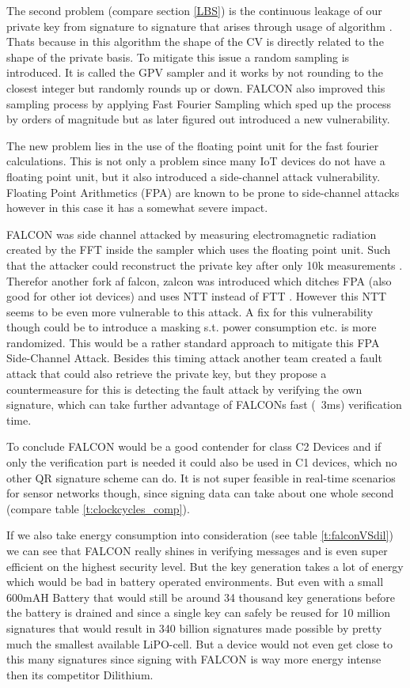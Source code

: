 \documentclass[conference]{IEEEtran}
\begin{document}
The second problem (compare section \ref{LBS}) is the continuous leakage of our private key from signature to signature that arises through usage of algorithm \label{alg:babel}. Thats because in this algorithm the shape of the CV is directly related to the shape of the private basis.
To mitigate this issue a random sampling is introduced. It is called the GPV sampler \cite{falcon_easyier_read} and it works by not rounding to the closest integer but randomly rounds up or down.
FALCON also improved this sampling process by applying Fast Fourier Sampling which sped up the process by orders of magnitude but as later figured out introduced a new vulnerability. 

The new problem lies in the use of the floating point unit for the fast fourier calculations. This is not only a problem since many IoT devices do not have a floating point unit, but it also introduced a side-channel attack vulnerability.
Floating Point Arithmetics (FPA) are known to be prone to side-channel attacks however in this case it has a somewhat severe impact.

FALCON was side channel attacked by measuring electromagnetic radiation created by the FFT inside the sampler which uses the floating point unit. Such that the attacker could reconstruct the private key after only 10k measurements \cite{falcon_side_channel}. Therefor another fork af falcon, zalcon was introduced which ditches FPA (also good for other iot devices) and uses NTT instead of FTT \cite{zalcon}. However this NTT seems to be even more vulnerable to this attack\cite{falcon_side_channel}. A fix for this vulnerability though could be to introduce a masking s.t. power consumption etc. is more randomized. This would be a rather standard approach to mitigate this FPA Side-Channel Attack.
Besides this timing attack another team \cite{bearz} created a fault attack that could also retrieve the private key, but they propose a countermeasure for this is detecting the fault attack by verifying the own signature, which can take further advantage of FALCONs fast (~3ms) verification time.

To conclude FALCON would be a good contender for class C2 Devices and if only the verification part is needed it could also be used in C1 devices, which no other QR signature scheme can do. 
It is not super feasible in real-time scenarios for sensor networks though, since signing data can take about one whole second (compare table \ref{t:clockcycles_comp}).

If we also take energy consumption into consideration (see table \ref{t:falconVSdil}) we can see that FALCON really shines in verifying messages and is even super efficient on the highest security level. But the key generation takes a lot of energy which would be bad in battery operated environments. But even with a small 600mAH Battery that would still be around 34 thousand key generations before the battery is drained and since a single key can safely be reused for 10 million signatures that would result in 340 billion signatures made possible by pretty much the smallest available LiPO-cell. But a device would not even get close to this many signatures since signing with FALCON is way more energy intense then its competitor Dilithium.
\end{document}
